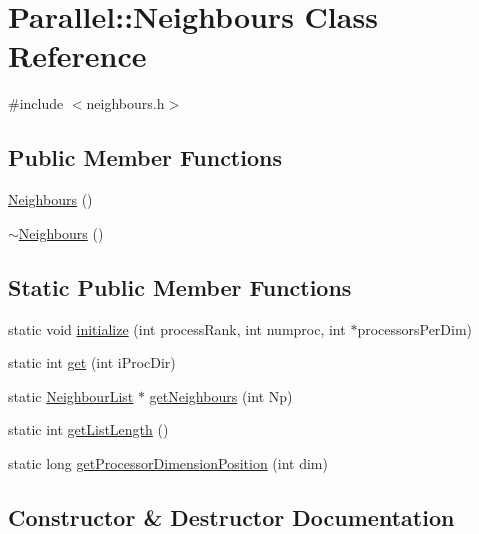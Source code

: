 \hypertarget{class_parallel_1_1_neighbours}{}\section{Parallel\+::Neighbours Class Reference}
\label{class_parallel_1_1_neighbours}


{\ttfamily \#include $<$neighbours.\+h$>$}

\subsection*{Public Member Functions}
\begin{DoxyCompactItemize}
\item 
\mbox{\hyperlink{class_parallel_1_1_neighbours_a4d96a6238767e2662ed3dbad9ff29a32}{Neighbours}} ()
\item 
\mbox{\hyperlink{class_parallel_1_1_neighbours_a5c3a373ff91768a91099e7b347a62ce9}{$\sim$\+Neighbours}} ()
\end{DoxyCompactItemize}
\subsection*{Static Public Member Functions}
\begin{DoxyCompactItemize}
\item 
static void \mbox{\hyperlink{class_parallel_1_1_neighbours_a5838dbe2c3c086c5943b5b75ad8fa35c}{initialize}} (int process\+Rank, int numproc, int $\ast$processors\+Per\+Dim)
\item 
static int \mbox{\hyperlink{class_parallel_1_1_neighbours_a84653f3e22436280ac5a4689a24e7146}{get}} (int i\+Proc\+Dir)
\item 
static \mbox{\hyperlink{struct_neighbour_list}{Neighbour\+List}} $\ast$ \mbox{\hyperlink{class_parallel_1_1_neighbours_a246afc374290bb0d3e86c07892872392}{get\+Neighbours}} (int Np)
\item 
static int \mbox{\hyperlink{class_parallel_1_1_neighbours_aadbdf345a7b541bd6705bddac1969961}{get\+List\+Length}} ()
\item 
static long \mbox{\hyperlink{class_parallel_1_1_neighbours_ad1a2a616b4089eded3545faf11409b85}{get\+Processor\+Dimension\+Position}} (int dim)
\end{DoxyCompactItemize}


\subsection{Constructor \& Destructor Documentation}
\mbox{\label{class_parallel_1_1_neighbours_a4d96a6238767e2662ed3dbad9ff29a32}} 
